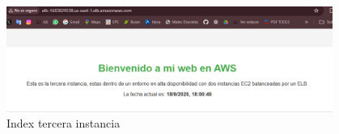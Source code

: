\documentclass{article}
\begin{document}
	\begin{figure}[H]
	\centering
	\includegraphics[width=0.95\textwidth]{tercera_instancia_disponible.png}
	\caption{Index tercera instancia}
	\end{figure}

	
\end{document}

